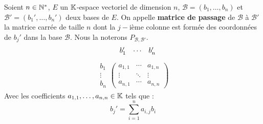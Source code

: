 \begin{definition}
    Soient $n \in \mathbb{N}^*$, $E$ un $\mathbb{K}$-espace vectoriel de dimension $n$, $\mathcal{B} = (b_1, \ldots, b_n)$ et $\mathcal{B}' = (b_1', \ldots, b_n')$ deux bases de $E$. On appelle \textbf{matrice de passage} de $\mathcal{B}$ à $\mathcal{B}'$ la matrice carrée de taille $n$ dont la $j-$ième colonne est formée des coordonnées de $b_j'$ dans la base $\mathcal{B}$. Nous la noterons $P_{\mathcal{B}, \mathcal{B}'}$.
    \begin{align*}
    	\hspace{0.45cm}
    	\begin{matrix}
    		b_1' & \cdots & b_n' 
    	\end{matrix}
    \end{align*}
    \begin{align*}
    	\begin{matrix}
    		b_1 \\
    		\vdots \\ 
    		b_n
    	\end{matrix}
    	\begin{pmatrix}
    		a_{1,1} & \cdots & a_{1,n} \\
    		\vdots & \ddots & \vdots \\ 
    		a_{n,1} & \cdots & a_{n,n}
    	\end{pmatrix}
    \end{align*}
    Avec les coefficients $a_{1,1}, \ldots, a_{n,n} \in \mathbb{K}$ tels que :
    \[ b_j' = \sum_{i=1}^{n} a_{i,j} b_i  \]
\end{definition}

